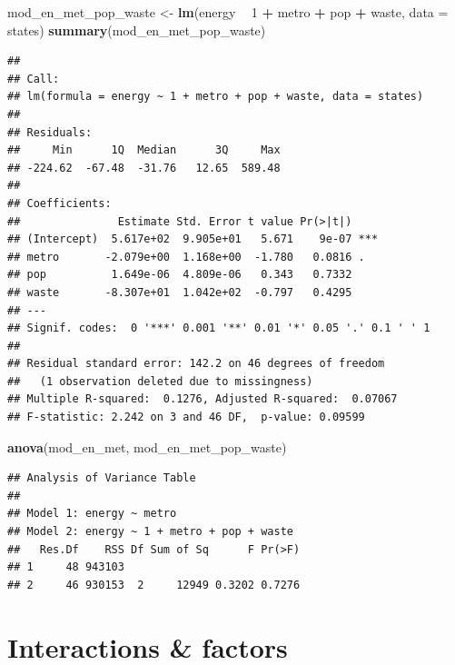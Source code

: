 \documentclass[]{book}
\newenvironment{Shaded}{\begin{snugshade}}{\end{snugshade}}
\newcommand{\DataTypeTok}[1]{\textcolor[rgb]{0.13,0.29,0.53}{#1}}
\newcommand{\DecValTok}[1]{\textcolor[rgb]{0.00,0.00,0.81}{#1}}
\newcommand{\KeywordTok}[1]{\textcolor[rgb]{0.13,0.29,0.53}{\textbf{#1}}}
\newcommand{\NormalTok}[1]{#1}
\newcommand{\OperatorTok}[1]{\textcolor[rgb]{0.81,0.36,0.00}{\textbf{#1}}}
\newcommand{\StringTok}[1]{\textcolor[rgb]{0.31,0.60,0.02}{#1}}
\begin{document}
\begin{Shaded}
\begin{Highlighting}[]
\NormalTok{  mod_en_met_pop_waste <-}\StringTok{ }\KeywordTok{lm}\NormalTok{(energy }\OperatorTok{~}\StringTok{ }\DecValTok{1} \OperatorTok{+}\StringTok{ }\NormalTok{metro }\OperatorTok{+}\StringTok{ }\NormalTok{pop }\OperatorTok{+}\StringTok{ }\NormalTok{waste, }\DataTypeTok{data =}\NormalTok{ states)}
  \KeywordTok{summary}\NormalTok{(mod_en_met_pop_waste)}
\end{Highlighting}
\end{Shaded}

\begin{verbatim}
## 
## Call:
## lm(formula = energy ~ 1 + metro + pop + waste, data = states)
## 
## Residuals:
##     Min      1Q  Median      3Q     Max 
## -224.62  -67.48  -31.76   12.65  589.48 
## 
## Coefficients:
##               Estimate Std. Error t value Pr(>|t|)    
## (Intercept)  5.617e+02  9.905e+01   5.671    9e-07 ***
## metro       -2.079e+00  1.168e+00  -1.780   0.0816 .  
## pop          1.649e-06  4.809e-06   0.343   0.7332    
## waste       -8.307e+01  1.042e+02  -0.797   0.4295    
## ---
## Signif. codes:  0 '***' 0.001 '**' 0.01 '*' 0.05 '.' 0.1 ' ' 1
## 
## Residual standard error: 142.2 on 46 degrees of freedom
##   (1 observation deleted due to missingness)
## Multiple R-squared:  0.1276, Adjusted R-squared:  0.07067 
## F-statistic: 2.242 on 3 and 46 DF,  p-value: 0.09599
\end{verbatim}

\begin{Shaded}
\begin{Highlighting}[]
  \KeywordTok{anova}\NormalTok{(mod_en_met, mod_en_met_pop_waste)}
\end{Highlighting}
\end{Shaded}

\begin{verbatim}
## Analysis of Variance Table
## 
## Model 1: energy ~ metro
## Model 2: energy ~ 1 + metro + pop + waste
##   Res.Df    RSS Df Sum of Sq      F Pr(>F)
## 1     48 943103                           
## 2     46 930153  2     12949 0.3202 0.7276
\end{verbatim}

\hypertarget{interactions-factors}{%
\section{Interactions \& factors}\label{interactions-factors}}
\end{document}
